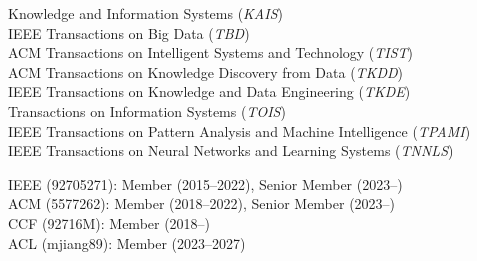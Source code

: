\documentclass[10pt]{article}
\newenvironment{myindentpar}[1]%
{\begin{list}{}%
         {\setlength{\leftmargin}{#1}}%
         \item[]%
}
{\end{list}}
\newcounter{list}
\begin{document}
\begin{myindentpar}{0.75cm}
{%
Knowledge and Information Systems (\textit{KAIS}) \\
IEEE Transactions on Big Data (\textit{TBD}) \\
ACM Transactions on Intelligent Systems and Technology (\textit{TIST}) \\
ACM Transactions on Knowledge Discovery from Data (\textit{TKDD}) \\
IEEE Transactions on Knowledge and Data Engineering (\textit{TKDE}) \\
Transactions on Information Systems (\textit{TOIS}) \\
IEEE Transactions on Pattern Analysis and Machine Intelligence (\textit{TPAMI}) \\
IEEE Transactions on Neural Networks and Learning Systems (\textit{TNNLS})

}

\hspace{-0.75cm}{\bf Professional Membership}

{\small

IEEE (92705271): Member (2015--2022), Senior Member (2023--) \\
ACM (5577262): Member (2018--2022), Senior Member (2023--) \\
CCF (92716M): Member (2018--) \\
ACL (mjiang89): Member (2023--2027)
}

\end{myindentpar}
\end{document}
